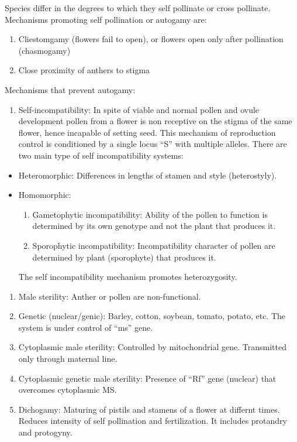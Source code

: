 \documentclass[
  openany]{book}
\providecommand{\tightlist}{%
  \setlength{\itemsep}{0pt}\setlength{\parskip}{0pt}}
\begin{document}
Species differ in the degrees to which they self pollinate or cross pollinate. Mechanisms promoting self pollination or autogamy are:

\begin{enumerate}
\def\labelenumi{\arabic{enumi}.}
\tightlist
\item
  Cliestomgamy (flowers fail to open), or flowers open only after pollination (chasmogamy)
\item
  Close proximity of anthers to stigma
\end{enumerate}

Mechanisms that prevent autogamy:

\begin{enumerate}
\def\labelenumi{\arabic{enumi}.}
\tightlist
\item
  Self-incompatibility: In spite of viable and normal pollen and ovule development pollen from a flower is non receptive on the stigma of the same flower, hence incapable of setting seed. This mechanism of reproduction control is conditioned by a single locus ``S'' with multiple alleles. There are two main type of self incompatibility systems:
\end{enumerate}

\begin{itemize}
\tightlist
\item
  Heteromorphic: Differences in lengths of stamen and style (heterostyly).
\item
  Homomorphic:

  \begin{enumerate}
  \def\labelenumi{\arabic{enumi}.}
  \tightlist
  \item
    Gametophytic incompatibility: Ability of the pollen to function is determined by its own genotype and not the plant that produces it.
  \item
    Sporophytic incompatibility: Incompatibility character of pollen are determined by plant (sporophyte) that produces it.
  \end{enumerate}

  The self incompatibility mechanism promotes heterozygosity.
\end{itemize}

\begin{enumerate}
\def\labelenumi{\arabic{enumi}.}
\setcounter{enumi}{1}
\item
  Male sterility: Anther or pollen are non-functional.
\item
  Genetic (nuclear/genic): Barley, cotton, soybean, tomato, potato, etc. The system is under control of ``ms'' gene.
\item
  Cytoplasmic male sterility: Controlled by mitochondrial gene. Transmitted only through maternal line.
\item
  Cytoplasmic genetic male sterility: Presence of ``Rf'' gene (nuclear) that overcomes cytoplasmic MS.
\item
  Dichogamy: Maturing of pistils and stamens of a flower at differnt times. Reduces intensity of self pollination and fertilization. It includes protandry and protogyny.
\end{enumerate}
\end{document}
